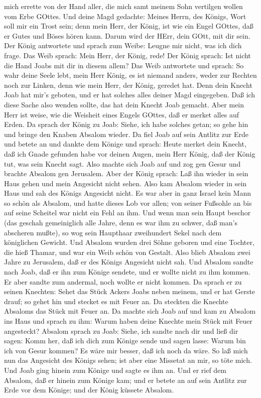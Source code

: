 mich errette von der Hand aller, die mich samt meinem Sohn vertilgen
wollen vom Erbe GOttes.  Und deine Magd gedachte: Meines
Herrn, des Königs, Wort soll mir ein Trost sein; denn mein Herr, der
König, ist wie ein Engel GOttes, daß er Gutes und Böses hören kann.
Darum wird der HErr, dein GOtt, mit dir sein.  Der König
antwortete und sprach zum Weibe: Leugne mir nicht, was ich dich frage.
Das Weib sprach: Mein Herr, der König, rede!  Der König
sprach: Ist nicht die Hand Joabs mit dir in diesem allem? Das Weib
antwortete und sprach: So wahr deine Seele lebt, mein Herr König, es ist
niemand anders, weder zur Rechten noch zur Linken, denn wie mein Herr,
der König, geredet hat. Denn dein Knecht Joab hat mir's geboten, und er
hat solches alles deiner Magd eingegeben.  Daß ich diese
Sache also wenden sollte, das hat dein Knecht Joab gemacht. Aber mein
Herr ist weise, wie die Weisheit eines Engels GOttes, daß er merket
alles auf Erden.  Da sprach der König zu Joab: Siehe, ich
habe solches getan; so gehe hin und bringe den Knaben Absalom wieder.
 Da fiel Joab auf sein Antlitz zur Erde und betete an und
dankte dem Könige und sprach: Heute merket dein Knecht, daß ich Gnade
gefunden habe vor deinen Augen, mein Herr König, daß der König tut, was
sein Knecht sagt.  Also machte sich Joab auf und zog gen
Gesur und brachte Absalom gen Jerusalem.  Aber der König
sprach: Laß ihn wieder in sein Haus gehen und mein Angesicht nicht
sehen. Also kam Absalom wieder in sein Haus und sah des Königs Angesicht
nicht.  Es war aber in ganz Israel kein Mann so schön als
Absalom, und hatte dieses Lob vor allen; von seiner Fußsohle an bis auf
seine Scheitel war nicht ein Fehl an ihm.  Und wenn man
sein Haupt beschor (das geschah gemeiniglich alle Jahre, denn es war ihm
zu schwer, daß man's abscheren mußte), so wog sein Haupthaar zweihundert
Sekel nach dem königlichen Gewicht.  Und Absalom wurden
drei Söhne geboren und eine Tochter, die hieß Thamar, und war ein Weib
schön von Gestalt.  Also blieb Absalom zwei Jahre zu
Jerusalem, daß er des Königs Angesicht nicht sah.  Und
Absalom sandte nach Joab, daß er ihn zum Könige sendete, und er wollte
nicht zu ihm kommen. Er aber sandte zum andermal, noch wollte er nicht
kommen.  Da sprach er zu seinen Knechten: Sehet das Stück
Ackers Joabs neben meinem, und er hat Gerste drauf; so gehet hin und
stecket es mit Feuer an. Da steckten die Knechte Absaloms das Stück mit
Feuer an.  Da machte sich Joab auf und kam zu Absalom ins
Haus und sprach zu ihm: Warum haben deine Knechte mein Stück mit Feuer
angesteckt?  Absalom sprach zu Joab: Siehe, ich sandte nach
dir und ließ dir sagen: Komm her, daß ich dich zum Könige sende und
sagen lasse: Warum bin ich von Gesur kommen? Es wäre mir besser, daß ich
noch da wäre. So laß mich nun das Angesicht des Königs sehen; ist aber
eine Missetat an mir, so töte mich.  Und Joab ging hinein
zum Könige und sagte es ihm an. Und er rief dem Absalom, daß er hinein
zum Könige kam; und er betete an auf sein Antlitz zur Erde vor dem
Könige; und der König küssete Absalom.

